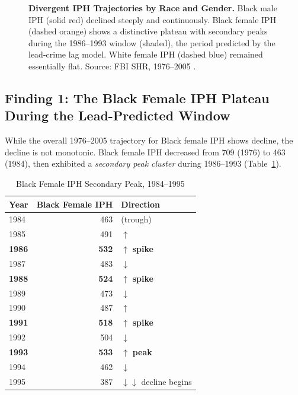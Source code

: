 \documentclass[12pt, letterpaper]{article}
\begin{document}
\begin{figure}[H]
\caption{\textbf{Divergent IPH Trajectories by Race and Gender.} Black male IPH (solid red) declined steeply and continuously. Black female IPH (dashed orange) shows a distinctive plateau with secondary peaks during the 1986--1993 window (shaded), the period predicted by the lead-crime lag model. White female IPH (dashed blue) remained essentially flat. Source: FBI SHR, 1976--2005 \citep{fox2007}.}
\label{fig:iph_race_gender}
\end{figure}

\subsection{Finding 1: The Black Female IPH Plateau During the Lead-Predicted Window}

While the overall 1976--2005 trajectory for Black female IPH shows decline, the decline is not monotonic. Black female IPH decreased from 709 (1976) to 463 (1984), then exhibited a \textit{secondary peak cluster} during 1986--1993 (Table~\ref{tab:bf_plateau}).

\begin{table}[H]
\centering
\caption{Black Female IPH Secondary Peak, 1984--1995}
\label{tab:bf_plateau}
\begin{tabular}{lrl}
\toprule
\textbf{Year} & \textbf{Black Female IPH} & \textbf{Direction} \\
\midrule
1984 & 463 & (trough) \\
1985 & 491 & $\uparrow$ \\
\textbf{1986} & \textbf{532} & $\uparrow$ \textbf{spike} \\
1987 & 483 & $\downarrow$ \\
\textbf{1988} & \textbf{524} & $\uparrow$ \textbf{spike} \\
1989 & 473 & $\downarrow$ \\
1990 & 487 & $\uparrow$ \\
\textbf{1991} & \textbf{518} & $\uparrow$ \textbf{spike} \\
1992 & 504 & $\downarrow$ \\
\textbf{1993} & \textbf{533} & $\uparrow$ \textbf{peak} \\
1994 & 462 & $\downarrow$ \\
1995 & 387 & $\downarrow\downarrow$ decline begins \\
\bottomrule
\end{tabular}
\end{table}
\end{document}
